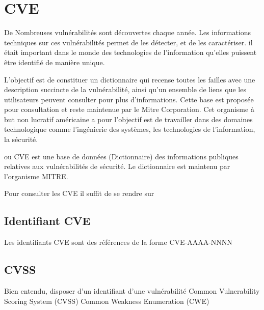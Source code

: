 \section{ CVE}

De Nombreuses vulnérabilités sont découvertes chaque année. Les informations techniques sur ces vulnérabilités permet de les détecter, et de les caractériser. il était important dans le monde des technologies de l'information qu'elles puissent être identifié de manière unique.  


L’objectif est de constituer un dictionnaire qui recense toutes les failles avec une description succincte de la vulnérabilité, ainsi qu’un ensemble de liens que les utilisateurs peuvent consulter pour plus d’informations. Cette base  est proposée pour consultation et reste maintenue par le Mitre Corporation.  Cet organisme à but non lucratif américaine a pour  l'objectif est de travailler dans des domaines technologique comme l'ingénierie des systèmes, les technologies de l'information, la sécurité. 
 
 ou CVE est une base de données (Dictionnaire) des informations publiques relatives aux vulnérabilités de sécurité. Le dictionnaire est maintenu par l'organisme MITRE.


Pour consulter les CVE il suffit de se rendre sur 

\subsection{Identifiant CVE}

Les identifiants CVE sont des références de la forme CVE-AAAA-NNNN 

\subsection{CVSS}

Bien entendu, disposer d'un identifiant d'une vulnérabilité
Common Vulnerability Scoring System (CVSS)
Common Weakness Enumeration (CWE)